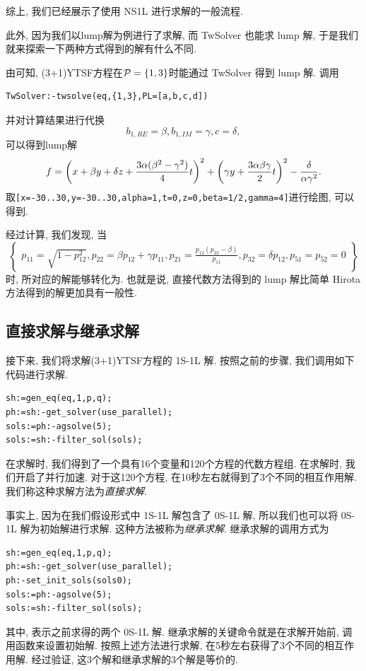 综上, 我们已经展示了使用 NS1L 进行求解的一般流程. 

此外, 因为我们以lump解为例进行了求解, 而 TwSolver 也能求 lump 解, 于是我们就来探索一下两种方式得到的解有什么不同. 

由可知, (3+1)YTSF方程在$\mathcal{P}=\left\{1,3\right\}$时能通过 TwSolver 得到 lump 解. 调用
\begin{verbatim}
TwSolver:-twsolve(eq,{1,3},PL=[a,b,c,d])
\end{verbatim}
并对计算结果进行代换
\begin{equation}
    b_{1,RE}=\beta,b_{1,IM}=\gamma,c=\delta,
\end{equation}
可以得到lump解
\begin{equation}
    f=\left(x+\beta y + \delta z+ \frac{3\alpha (\beta^2-\gamma^2)}{4}t\right)^2+\left(\gamma y+\frac{3\alpha \beta \gamma}{2}t\right)^2-\frac{\delta}{\alpha \gamma^2}. \label{0S1L-3}
\end{equation}
取\verb|[x=-30..30,y=-30..30,alpha=1,t=0,z=0,beta=1/2,gamma=4]|进行绘图, 可以得到. 

经过计算, 我们发现, 当
\begin{equation}
\left\{ 
\begin{array}{l}
p_{11}=\sqrt{1-p_{12}^2},
p_{22}=\beta p_{12}+\gamma p_{11},
p_{21}=\frac{p_{12}(p_{22}-\beta)}{p_{11}},  
p_{32}=\delta p_{12},p_{51}=p_{52}=0
\end{array}
\right\}
\end{equation}
时, 所对应的解能够转化为. 也就是说, 直接代数方法得到的 lump 解比简单 Hirota 方法得到的解更加具有一般性. 

\subsection{直接求解与继承求解}

接下来, 我们将求解(3+1)YTSF方程的 1S-1L 解. 按照之前的步骤, 我们调用如下代码进行求解. 
\begin{verbatim}
sh:=gen_eq(eq,1,p,q);
ph:=sh:-get_solver(use_parallel);
sols:=ph:-agsolve(5);
sols:=sh:-filter_sol(sols);
\end{verbatim}

在求解时, 我们得到了一个具有16个变量和120个方程的代数方程组. 在求解时, 我们开启了并行加速. 对于这120个方程, 在10秒左右就得到了3个不同的相互作用解. 我们称这种求解方法为\emph{直接求解}.

事实上, 因为在我们假设形式中 1S-1L 解包含了 0S-1L 解, 所以我们也可以将 0S-1L 解为初始解进行求解. 这种方法被称为\emph{继承求解}. 继承求解的调用方式为
\begin{verbatim}
sh:=gen_eq(eq,1,p,q);
ph:=sh:-get_solver(use_parallel);
ph:-set_init_sols(sols0);
sols:=ph:-agsolve(5);
sols:=sh:-filter_sol(sols);
\end{verbatim}
其中, 表示之前求得的两个 0S-1L 解. 继承求解的关键命令就是在求解开始前, 调用函数来设置初始解. 按照上述方法进行求解, 在5秒左右获得了3个不同的相互作用解. 经过验证, 这3个解和继承求解的3个解是等价的.

